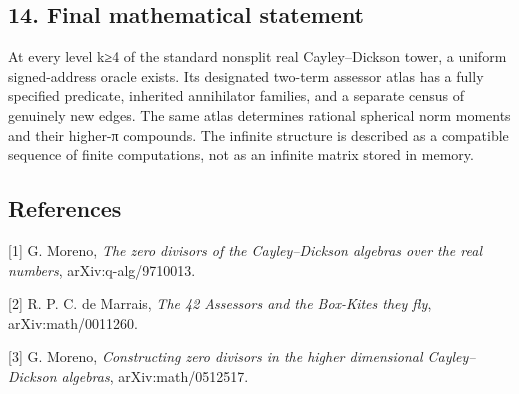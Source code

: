 \documentclass[
  10pt,
]{article}
\begin{document}
\subsection{14. Final mathematical
statement}\label{final-mathematical-statement}

At every level k≥4 of the standard nonsplit real Cayley--Dickson tower,
a uniform signed-address oracle exists. Its designated two-term assessor
atlas has a fully specified predicate, inherited annihilator families,
and a separate census of genuinely new edges. The same atlas determines
rational spherical norm moments and their higher-π compounds. The
infinite structure is described as a compatible sequence of finite
computations, not as an infinite matrix stored in memory.

\subsection{References}\label{references}

{[}1{]} G. Moreno, \emph{The zero divisors of the Cayley--Dickson
algebras over the real numbers}, arXiv:q-alg/9710013.

{[}2{]} R. P. C. de Marrais, \emph{The 42 Assessors and the Box-Kites
they fly}, arXiv:math/0011260.

{[}3{]} G. Moreno, \emph{Constructing zero divisors in the higher
dimensional Cayley--Dickson algebras}, arXiv:math/0512517.
\end{document}
